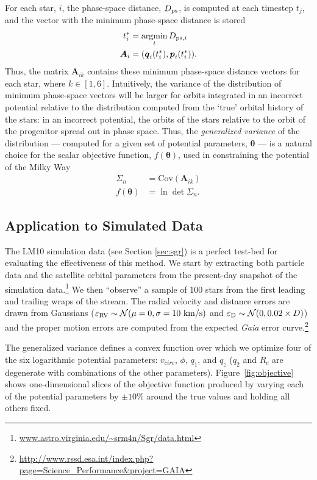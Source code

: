\documentclass{emulateapj}
\newcommand{\bs}{\boldsymbol}
\newcommand{\argmin}{\operatornamewithlimits{argmin}}
\begin{document}
For each star, $i$,
the phase-space distance, $D_{\rm ps}$, is computed at each timestep
$t_{j}$, and the vector with the minimum phase-space distance is stored
\begin{align}
  t^*_{i} &= \argmin_{t} D_{{\rm ps},i}\\
  \bs{A}_{i} &= (\bs{q}_{i}(t^*_{i}),\bs{p}_{i}(t^*_{i})).
\end{align}
Thus, the matrix $\bs{A}_{ik}$ contains these minimum phase-space
distance vectors for each star, where $k\in[1,6]$. Intuitively, the
variance of the distribution of minimum phase-space vectors will be
larger for orbits integrated in an incorrect potential relative to the
distribution computed from the `true' orbital history of the stars: in
an incorrect potential, the orbits of the stars relative to the orbit of 
the progenitor spread out in phase space. Thus, the \emph{generalized
 variance} of the distribution --- computed for a given set of
potential parameters, $\bs{\theta}$ --- is a natural choice for the
scalar objective function, $f(\bs{\theta})$, used in constraining the potential of the
Milky Way
\begin{align}
  \Sigma_n &= \mathrm{Cov}( \bs{A}_{ik}) \\
  f(\bs{\theta}) &= \ln \det \Sigma_n.
\end{align}

\subsection{Application to Simulated Data} \label{sec:results}
The LM10 simulation data (see Section \ref{sec:sgr}) is a perfect
test-bed for evaluating the effectiveness of this method. We start by
extracting both particle data and the satellite orbital parameters
from the present-day snapshot of the simulation
data.\footnote{\url{www.astro.virginia.edu/~srm4n/Sgr/data.html}} We
then ``observe'' a sample of 100 stars from the first leading and
trailing wraps of the stream. The radial velocity and distance errors are drawn 
from Gaussians ($\varepsilon_{\rm RV} \sim \mathcal{N}(\mu=0,\sigma=10~{\rm
  km/s})$ and $\varepsilon_{\rm D} \sim \mathcal{N}(0,0.02\times
D)$) and the proper motion errors are computed from the expected {\it Gaia} error curve.\footnote{\url{http://www.rssd.esa.int/index.php?page=Science_Performance&project=GAIA}} 

The generalized variance defines a convex function over
which we optimize four of the six logarithmic potential parameters:
$v_{circ}$, $\phi$, $q_1$, and $q_z$ ($q_2$ and $R_c$
are degenerate with combinations of the other parameters). 
Figure~\ref{fig:objective} shows one-dimensional slices of
the objective function produced by varying each of the potential
parameters by $\pm10\%$ around the true values and holding all others
fixed.
\end{document}
